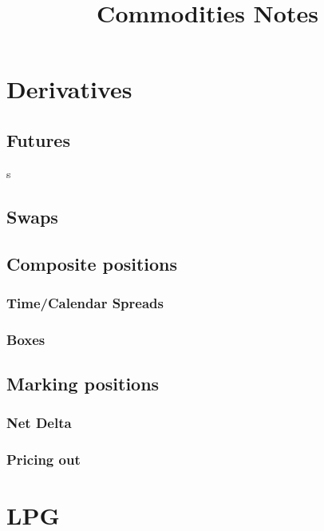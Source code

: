 \documentclass{article}
\title{Commodities Notes}
\date{}
\begin{document}
\maketitle
\tableofcontents


\section{Derivatives}
\subsection{Futures}
s
\subsection{Swaps}


\subsection{Composite positions}

\subsubsection{Time/Calendar Spreads}
\subsubsection{Boxes}


\subsection{Marking positions}

\subsubsection{Net Delta}
\subsubsection{Pricing out}



\section{LPG}
\end{document}
